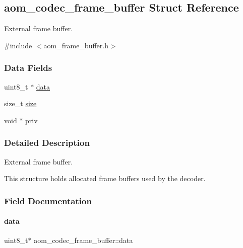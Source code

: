 \hypertarget{structaom__codec__frame__buffer}{}\subsection{aom\+\_\+codec\+\_\+frame\+\_\+buffer Struct Reference}
\label{structaom__codec__frame__buffer}


External frame buffer.  




{\ttfamily \#include $<$aom\+\_\+frame\+\_\+buffer.\+h$>$}

\subsubsection*{Data Fields}
\begin{DoxyCompactItemize}
\item 
uint8\+\_\+t $\ast$ \hyperlink{structaom__codec__frame__buffer_a4b73719e1d6756516de8cbceb68822d2}{data}
\item 
size\+\_\+t \hyperlink{structaom__codec__frame__buffer_a6fc24049c4e1706ce3a462825009f3d4}{size}
\item 
void $\ast$ \hyperlink{structaom__codec__frame__buffer_aa689f8e27421eebc9e1c70b607e415ef}{priv}
\end{DoxyCompactItemize}


\subsubsection{Detailed Description}
External frame buffer. 

This structure holds allocated frame buffers used by the decoder. 

\subsubsection{Field Documentation}
\mbox{\label{structaom__codec__frame__buffer_a4b73719e1d6756516de8cbceb68822d2}} 
\paragraph{\texorpdfstring{data}{data}}
{\footnotesize\ttfamily uint8\+\_\+t$\ast$ aom\+\_\+codec\+\_\+frame\+\_\+buffer\+::data}


